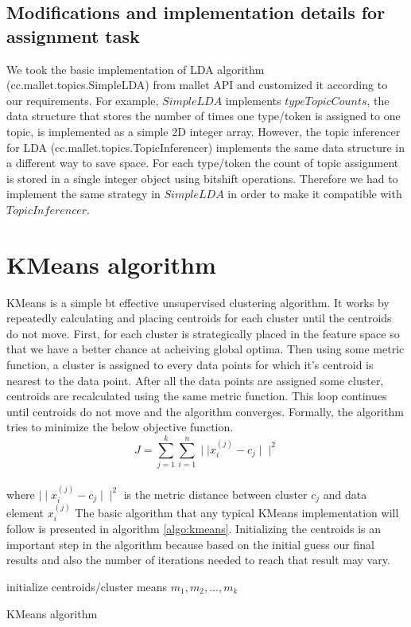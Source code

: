 \subsection{Modifications and implementation details for assignment task}
We took the basic implementation of LDA algorithm (cc.mallet.topics.SimpleLDA) from mallet API and customized it according to our requirements. For example, $SimpleLDA$ implements $typeTopicCounts$, the data structure that stores the number of times one type/token is assigned to one topic, is implemented as a simple 2D integer array. However, the topic inferencer for LDA (cc.mallet.topics.TopicInferencer) implements the same data structure in a different way to save space. For each type/token the count of topic assignment is stored in a single integer object using bitshift operations. Therefore we had to implement the same strategy in $SimpleLDA$ in order to make it compatible with $TopicInferencer$.
\section{KMeans algorithm}
\label{sec:kmeans}
KMeans is a simple bt effective unsupervised clustering algorithm. It works by repeatedly calculating and placing centroids for each cluster until the centroids do not move. First, for each cluster is strategically placed in the feature space so that we have a better chance at acheiving global optima. Then using some metric function, a cluster is assigned to every data points for which it's centroid is nearest to the data point. After all the data points are assigned some cluster, centroids are recalculated using the same metric function. This loop continues until centroids do not move and the algorithm converges. Formally, the algorithm tries to minimize the below objective function.
\begin{equation}
\label{eq:km}
J = \sum_{j=1}^k \sum_{i=1}^n \mid \mid x_i^{(j)} - c_j \mid \mid^2
\end{equation}
\\where $\mid \mid x_i^{(j)} - c_j \mid \mid^2$ is the metric distance between cluster $c_j$ and data element $x_i^{(j)}$
The basic algorithm that any typical KMeans implementation will follow is presented in algorithm \ref{algo:kmeans}. Initializing the centroids is an important step in the algorithm because based on the initial guess our final results and also the number of iterations needed to reach that result may vary.
\begin{algorithm}[htp]
\label{algo:kmeans}
 \SetAlgoLined\DontPrintSemicolon
 initialize centroids/cluster means $m_1, m_2, ... , m_k$\;
 \caption{KMeans algorithm}
\end{algorithm}
